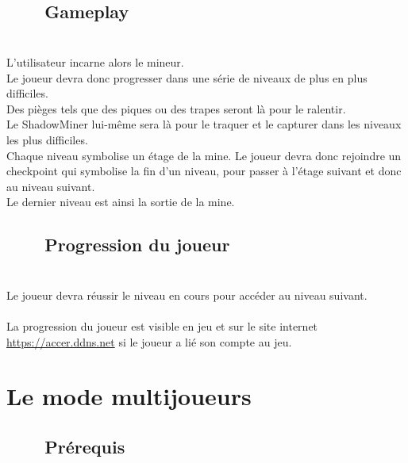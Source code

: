 \documentclass[titlepage, 13px, a4paper]{report}
\begin{document}
\subsection[Gameplay]{~~~~Gameplay}
\paragraph{} \hspace{0pt} \\
L’utilisateur incarne alors le mineur. \\
Le joueur devra donc progresser dans une série de niveaux de plus en plus difficiles. \\
Des pièges tels que des piques ou des trapes seront là pour le ralentir. \\
Le ShadowMiner lui-même sera là pour le traquer et le capturer dans les niveaux les plus difficiles. \\
Chaque niveau symbolise un étage de la mine. Le joueur devra donc rejoindre un checkpoint 
qui symbolise la fin d’un niveau, pour passer à l’étage suivant et donc au niveau suivant. \\
Le dernier niveau est ainsi la sortie de la mine. \\ 

\subsection[Progression du joueur]{~~~~Progression du joueur}
\paragraph{} \hspace{0pt} \\
Le joueur devra réussir le niveau en cours pour accéder au niveau suivant. \\ \\
La progression du joueur est visible en jeu et sur le site internet \url{https://accer.ddns.net} si le joueur a lié son compte au jeu. \\

\newpage

\section{Le mode multijoueurs}

\subsection[Prérequis]{~~~~Prérequis}
\end{document}
